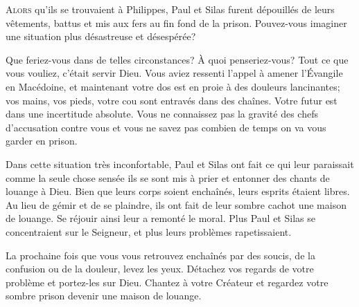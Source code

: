 \jrnlmonth





\lettrine{A}{lors} qu'ils se trouvaient à Philippes,
 Paul et Silas furent dépouillés de leurs vêtements,
 battus et mis aux fers au fin fond de la prison.
 Pouvez-vous imaginer une situation plus désastreuse et désespérée?

Que feriez-vous dans de telles circonstances? À quoi penseriez-vous?
 Tout ce que vous vouliez, c'était servir Dieu.
 Vous aviez ressenti l'appel à amener l'Évangile en Macédoine,
 et maintenant votre dos est en proie
 à des douleurs lancinantes;
 vos mains, vos pieds, votre cou sont entravés dans des chaînes.
 Votre futur est dans une incertitude absolute.
 Vous ne connaissez pas la gravité des chefs d'accusation
 contre vous et vous ne savez pas combien de temps
 on va vous garder en prison.

Dans cette situation très inconfortable, Paul et Silas
 ont fait ce qui leur paraissait comme la seule chose sensée\frcolon{}
 ils se sont mis à prier et entonner des chants de louange à Dieu.
 Bien que leurs corps soient enchaînés, leurs esprits étaient libres.
 Au lieu de gémir et de se plaindre, ils ont fait de leur sombre cachot
 une maison de louange. Se réjouir ainsi leur a remonté le moral.
 Plus Paul et Silas se concentraient sur le Seigneur,
 et plus leurs problèmes rapetissaient.


La prochaine fois que vous vous retrouvez enchaînés par des soucis,
 de la confusion ou de la douleur, levez les yeux.
 Détachez vos regards de votre problème et portez-les sur Dieu.
 Chantez à votre Créateur \ocadr et regardez votre sombre prison
 devenir une maison de louange.

\dvrule




